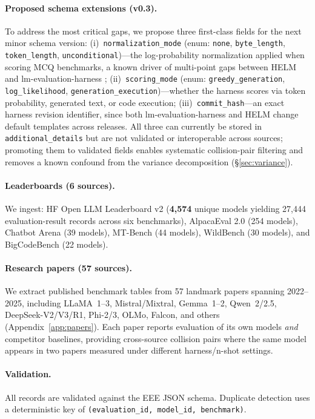 \documentclass[11pt]{article}
\begin{document}
\paragraph{Proposed schema extensions (v0.3).}
\label{par:extensions}
To address the most critical gaps, we propose three first-class fields
for the next minor schema version:
(i)~\texttt{normalization\_mode}
  (enum: \texttt{none}, \texttt{byte\_length},
  \texttt{token\_length}, \texttt{unconditional})---the
  log-probability normalization applied when scoring MCQ benchmarks,
  a known driver of multi-point gaps between HELM and
  lm-evaluation-harness \citep{alzahrani-2024-benchmarks};
(ii)~\texttt{scoring\_mode}
  (enum: \texttt{greedy\_generation}, \texttt{log\_likelihood},
  \texttt{generation\_execution})---whether the harness scores via
  token probability, generated text, or code execution;
(iii)~\texttt{commit\_hash}---an exact harness revision identifier,
  since both lm-evaluation-harness and HELM change default templates
  across releases.
All three can currently be stored in \texttt{additional\_details}
but are not validated or interoperable across sources; promoting them
to validated fields enables systematic collision-pair filtering and
removes a known confound from the variance decomposition
(\S\ref{sec:variance}).

\paragraph{Leaderboards (6 sources).}
We ingest: HF Open LLM Leaderboard v2 (\textbf{4,574} unique models
yielding 27,444 evaluation-result records across six benchmarks),
AlpacaEval 2.0 (254 models), Chatbot Arena
(39 models), MT-Bench (44 models), WildBench (30 models), and
BigCodeBench (22 models).

\paragraph{Research papers (57 sources).}
We extract published benchmark tables from 57 landmark papers spanning
2022--2025, including LLaMA~1--3, Mistral/Mixtral, Gemma~1--2,
Qwen~2/2.5, DeepSeek-V2/V3/R1, Phi-2/3, OLMo, Falcon, and others
(Appendix~\ref{app:papers}).
Each paper reports evaluation of its own models \emph{and} competitor
baselines, providing cross-source collision pairs where the same model
appears in two papers measured under different harness/n-shot settings.

\paragraph{Validation.}
All records are validated against the EEE JSON schema.
Duplicate detection uses a deterministic key of
\texttt{(evaluation\_id, model\_id, benchmark)}.
\end{document}
